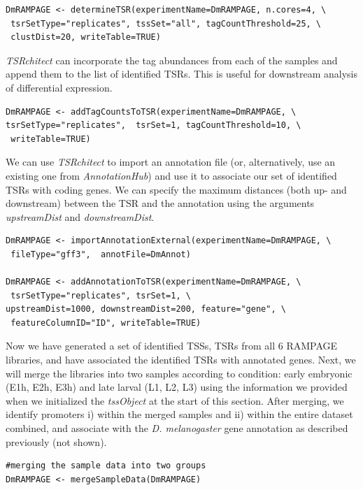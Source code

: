 \documentclass[runningheads,a4paper]{llncs}
\begin{document}
\begin{linenumbers}
\noindent
\begin{verbatim}
DmRAMPAGE <- determineTSR(experimentName=DmRAMPAGE, n.cores=4, \
 tsrSetType="replicates", tssSet="all", tagCountThreshold=25, \
 clustDist=20, writeTable=TRUE)
\end{verbatim}

\textit{TSRchitect} can incorporate the tag abundances from each of the samples and append them to the list of identified TSRs. 
This is useful for downstream analysis of differential expression.

\noindent
\begin{verbatim}
DmRAMPAGE <- addTagCountsToTSR(experimentName=DmRAMPAGE, \
tsrSetType="replicates",  tsrSet=1, tagCountThreshold=10, \
 writeTable=TRUE)
\end{verbatim}

We can use \textit{TSRchitect} to import an annotation file (or, alternatively, use an existing one from \textit{AnnotationHub}) and use it to associate our set of identified TSRs with coding genes. 
We can specify the maximum distances (both up- and downstream) between the TSR and the annotation using the arguments \textit{upstreamDist} and \textit{downstreamDist}.

\noindent
\begin{verbatim}
DmRAMPAGE <- importAnnotationExternal(experimentName=DmRAMPAGE, \
 fileType="gff3",  annotFile=DmAnnot)

DmRAMPAGE <- addAnnotationToTSR(experimentName=DmRAMPAGE, \
 tsrSetType="replicates", tsrSet=1, \
upstreamDist=1000, downstreamDist=200, feature="gene", \
 featureColumnID="ID", writeTable=TRUE)
\end{verbatim}

Now we have generated a set of identified TSSs, TSRs from all 6 RAMPAGE libraries, and have associated the identified TSRs with annotated genes. 
Next, we will merge the libraries into two samples according to condition: early embryonic (E1h, E2h, E3h) and late larval (L1, L2, L3) using the information we provided when we initialized the \textit{tssObject} at the start of this section.
After merging, we identify promoters i) within the merged samples and ii) within the entire dataset combined, and associate with the \textit{D. melanogaster} gene annotation as described previously (not shown).

\noindent
\begin{verbatim}
#merging the sample data into two groups
DmRAMPAGE <- mergeSampleData(DmRAMPAGE)


\end{verbatim}
\end{linenumbers}
\end{document}
